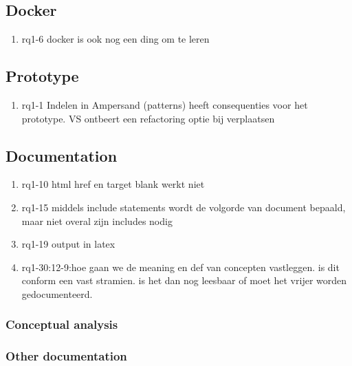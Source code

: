\subsection{Docker}
\begin{comment}
plaats hier de afgehandelde items.
\end{comment}
\begin{enumerate}
    \item rq1-6 docker is ook nog een ding om te leren

\end{enumerate}

\subsection{Prototype}
\begin{comment}
plaats hier de afgehandelde items.
\end{comment}
\begin{enumerate}
    \item rq1-1 Indelen in Ampersand (patterns) heeft consequenties voor het prototype. VS ontbeert een refactoring optie bij verplaatsen
\end{enumerate}

\subsection{Documentation}
\begin{comment}
plaats hier de afgehandelde items.
\end{comment}
\begin{enumerate}
    \item rq1-10 html href en target blank werkt niet    
    \item rq1-15 middels include statements wordt de volgorde van document bepaald, maar niet overal zijn includes nodig
    \item rq1-19 output in latex 
    \item rq1-30:12-9:hoe gaan we de meaning en def van concepten vastleggen. is dit conform een vast stramien. is het dan nog leesbaar of moet het vrijer worden gedocumenteerd.
    
\end{enumerate}

\subsubsection{Conceptual analysis}

\subsubsection{Other documentation}

